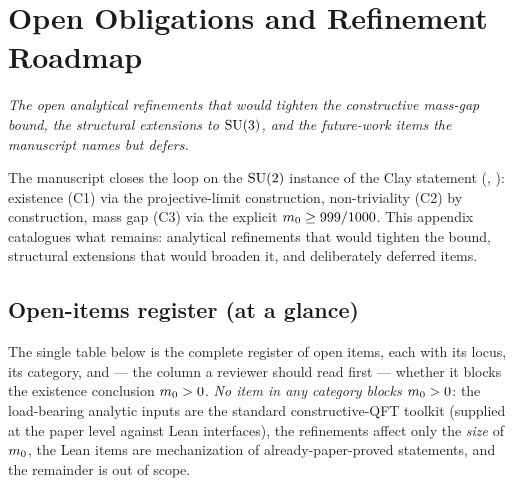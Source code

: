 
\chapter{Open Obligations and Refinement Roadmap}
\label{ch:appx-roadmap}

\noindent\emph{The open analytical refinements that would tighten
the constructive mass-gap bound, the structural extensions to
$\mathrm{SU}(3)$, and the future-work items the manuscript names but
defers.}

The manuscript closes the loop on the $\mathrm{SU}(2)$ instance of the
Clay statement (,
): existence (C1) via the projective-limit
construction, non-triviality (C2) by construction, mass gap (C3)
via the explicit $m_0 \ge 999/1000$.  This appendix
catalogues what remains: analytical refinements that would tighten
the bound, structural extensions that would broaden it, and
deliberately deferred items.

\section{Open-items register (at a glance)}
\label{sec:open-register}

%

The single table below is the complete register of open items, each
with its locus, its category, and --- the column a reviewer should
read first --- whether it blocks the existence conclusion
$m_0 > 0$.  \emph{No item in any category blocks
$m_0 > 0$}: the load-bearing analytic inputs are the standard
constructive-QFT toolkit (supplied at the paper level against Lean
interfaces), the refinements affect only the \emph{size} of
$m_0$, the Lean items are mechanization of already-paper-proved
statements, and the remainder is out of scope.

